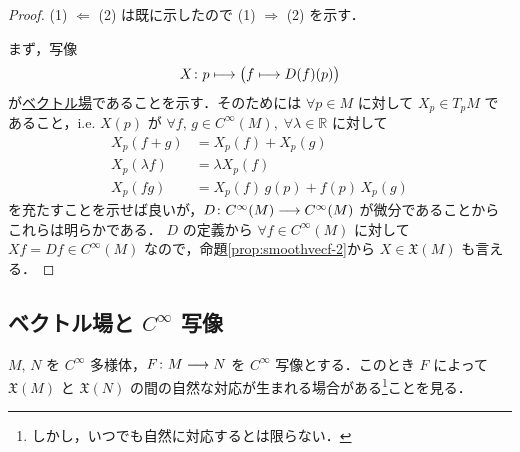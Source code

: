 \documentclass[TQFT_main]{subfiles}
\begin{document}
\begin{proof}
    (1) $\Longleftarrow$ (2) は既に示したので (1) $\Longrightarrow$ (2) を示す．

    まず，写像 
    \begin{align}
        X \colon p \longmapsto \bigl(f \longmapsto D(f)(p)\bigr)
    \end{align}
    が\hyperref[def:vecf]{ベクトル場}であることを示す．そのためには $\forall p \in M$ に対して $X_p \in T_p M$ であること，i.e. $X(p)$ が $\forall f,\, g \in C^\infty(M),\; \forall \lambda \in \mathbb{R}$ に対して
    \begin{align}
        X_p(f+g) &= X_p(f) + X_p(g) \\
        X_p(\lambda f) &=\lambda X_p(f) \\
        X_p(fg) &= X_p(f)\, g(p) + f(p)\, X_p(g) 
    \end{align}
    を充たすことを示せば良いが，$D \colon C^\infty (M) \longrightarrow C^\infty (M)$ が微分であることからこれらは明らかである．
    $D$ の定義から $\forall f \in C^\infty (M)$ に対して $Xf = Df \in C^\infty(M)$ なので，命題\ref{prop:smoothvecf-2}から $X \in \mathfrak{X}(M)$ も言える．
\end{proof}

\subsection{ベクトル場と $C^\infty$ 写像}

$M,\, N$ を $C^\infty$ 多様体，$F \colon M \longrightarrow N$ を $C^\infty$ 写像とする．このとき $F$ によって $\mathfrak{X}(M)$ と $\mathfrak{X}(N)$ の間の自然な対応が生まれる場合がある\footnote{しかし，いつでも自然に対応するとは限らない．}ことを見る．
\end{document}
